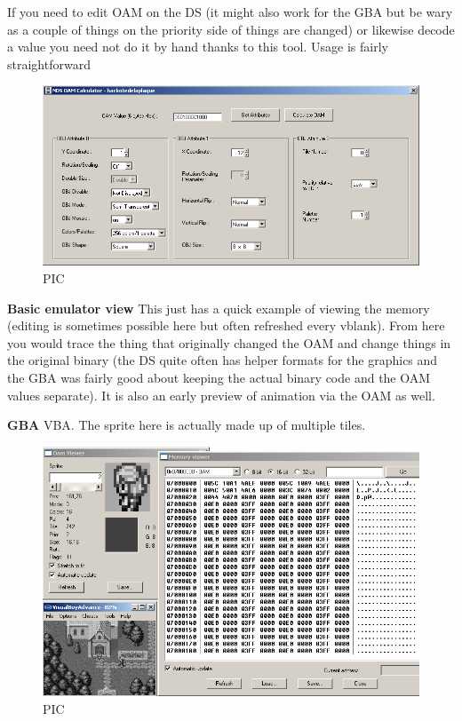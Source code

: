 \documentclass[
]{book}
\begin{document}
If you need to edit OAM on the DS (it might also work for the GBA but be wary as a couple of things on the priority side of things are changed) or likewise decode a value you need not do it by hand thanks to this tool. Usage is fairly straightforward

\begin{figure}
\centering
\includegraphics{images/30_home_fast6191_romhackingguide_unrenamed_file___orders_romhackingguidegraphicsOAMcalculator.png}
\caption{PIC}
\end{figure}

\textbf{Basic emulator view} This just has a quick example of viewing the memory (editing is sometimes possible here but often refreshed every vblank). From here you would trace the thing that originally changed the OAM and change things in the original binary (the DS quite often has helper formats for the graphics and the GBA was fairly good about keeping the actual binary code and the OAM values separate). It is also an early preview of animation via the OAM as well.

\textbf{GBA} VBA. The sprite here is actually made up of multiple tiles.

\begin{figure}
\centering
\includegraphics{images/31_home_fast6191_romhackingguide_unrenamed_files_and_original_borders_romhackingguide2dOAMvba_1.png}
\caption{PIC}
\end{figure}
\end{document}
